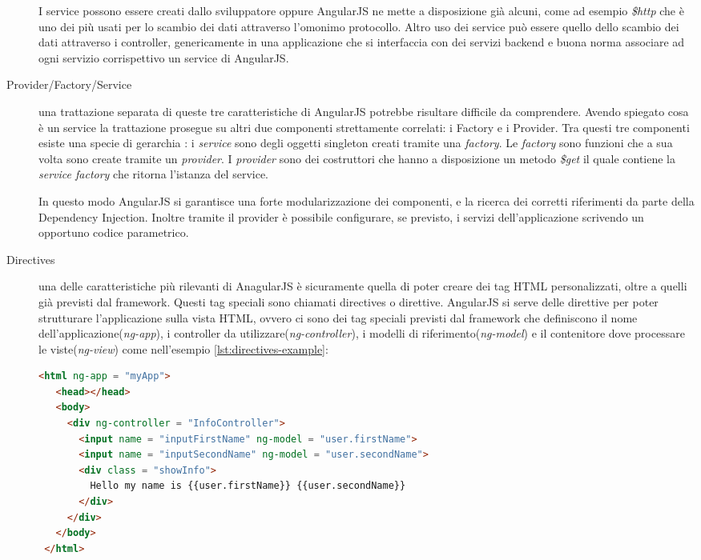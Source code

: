\begin{description}
I service possono essere creati dallo sviluppatore oppure AngularJS ne mette a disposizione già alcuni, come ad esempio \emph{\$http} che è uno dei più usati per lo scambio dei dati attraverso l'omonimo protocollo. Altro uso dei service può essere quello dello scambio dei dati attraverso i controller, genericamente in una applicazione che si interfaccia con dei servizi backend e buona norma associare ad ogni servizio corrispettivo un service di AngularJS.

\item[Provider/Factory/Service] una trattazione separata di queste tre caratteristiche di AngularJS potrebbe risultare difficile da comprendere. Avendo spiegato cosa è un service la trattazione prosegue su altri due componenti strettamente correlati: i Factory e i Provider.
Tra questi tre componenti esiste una specie di gerarchia : i \textit{service} sono degli oggetti singleton creati tramite una \textit{factory}. Le \textit{factory} sono funzioni che a sua volta sono create tramite un \textit{provider}. I \textit{provider} sono dei costruttori che hanno a disposizione un metodo \emph{\$get} il quale contiene la \emph{service factory} che ritorna l'istanza del service.

In questo modo AngularJS si garantisce una forte modularizzazione dei componenti, e la ricerca dei corretti riferimenti da parte della Dependency Injection. Inoltre tramite il provider è possibile configurare, se previsto, i servizi dell'applicazione scrivendo un opportuno codice parametrico.

\item[Directives] una delle caratteristiche più rilevanti di AnagularJS è sicuramente quella di poter creare dei tag HTML personalizzati, oltre a quelli già previsti dal framework. Questi tag speciali sono chiamati directives o direttive. AngularJS si serve delle direttive per poter strutturare l'applicazione sulla vista HTML, ovvero ci sono dei tag speciali previsti dal framework che definiscono il nome dell'applicazione(\textit{ng-app}), i controller da utilizzare(\textit{ng-controller}), i modelli di riferimento(\textit{ng-model}) e il contenitore dove processare le viste(\textit{ng-view}) come nell'esempio \ref{lst:directives-example}:
\begin{lstlisting}[language=html,caption={Un esempio delle direttive standard di AngularJS},
				   label={lst:directives-example}]
 <html ng-app = "myApp">
   <head></head>
   <body>
     <div ng-controller = "InfoController">
       <input name = "inputFirstName" ng-model = "user.firstName">
       <input name = "inputSecondName" ng-model = "user.secondName">
       <div class = "showInfo">
	     Hello my name is {{user.firstName}} {{user.secondName}}			
       </div>
     </div>
   </body>
 </html>
\end{lstlisting}


\end{description}
